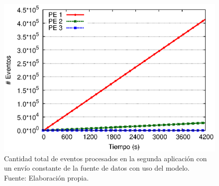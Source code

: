 \begin{figure}[!ht]
	\centering
	\captionsetup{justification=centering}
    \includegraphics[scale=0.7]{images/exp/app2/uniform/sm/eventCount.eps}
    \caption[Cantidad total de eventos procesados en la segunda aplicaci\'on con un env\'io constante de la fuente de datos con uso del modelo.]{Cantidad total de eventos procesados en la segunda aplicaci\'on con un env\'io constante de la fuente de datos con uso del modelo.\\Fuente: Elaboraci\'on propia.}
    \label{fig:app2-uniform-eventCount-sm}
\end{figure}


